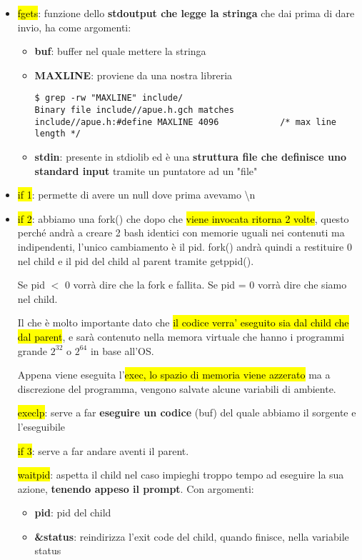 \begin{itemize}
	\item \hl{fgets}: funzione dello \textbf{stdoutput che legge la stringa} che dai prima di dare invio, ha come argomenti:
	
		\begin{itemize}
			\item \textbf{buf}: buffer nel quale mettere la stringa
		
			\item \textbf{MAXLINE}: proviene da una nostra libreria

\begin{lstlisting}
$ grep -rw "MAXLINE" include/
Binary file include//apue.h.gch matches
include//apue.h:#define	MAXLINE	4096			/* max line length */
\end{lstlisting}

			\item \textbf{stdin}: presente in stdiolib ed è una \textbf{struttura file che definisce uno standard input} tramite un puntatore ad un "file"
		\end{itemize}

	\item \hl{if 1}: permette di avere un null dove prima avevamo \textbackslash n
	
	\item \hl{if 2}: abbiamo una fork() che dopo che \hl{viene invocata ritorna 2 volte}, questo perché andrà a creare 2 bash identici con memorie uguali nei contenuti ma indipendenti, l'unico cambiamento è il pid. fork() andrà quindi a restituire 0 nel child e il pid del child al parent tramite getppid().

			Se pid $<$ 0 vorrà dire che la fork e fallita.
			Se pid = 0 vorrà dire che siamo nel child.
	
			Il che è molto importante dato che \hl{il codice verra' eseguito sia dal child che dal parent}, e sarà contenuto nella memora virtuale che hanno i programmi grande $2^{32}$ o $2^{64}$ in base all'OS.
	
			Appena viene eseguita l'\hl{exec, lo spazio di memoria viene azzerato} ma a discrezione del programma, vengono salvate alcune variabili di ambiente.


		\hl{execlp}: serve a far \textbf{eseguire un codice} (buf) del quale abbiamo il sorgente e l'eseguibile
	

		\hl{if 3}: serve a far andare aventi il parent.

		\hl{waitpid}: aspetta il child nel caso impieghi troppo tempo ad eseguire la sua azione, \textbf{tenendo appeso il prompt}. Con argomenti:

			\begin{itemize}
				\item \textbf{pid}: pid del child
				\item \textbf{\&status}: reindirizza l'exit code del child, quando finisce, nella variabile status
			\end{itemize}
			
\end{itemize}



